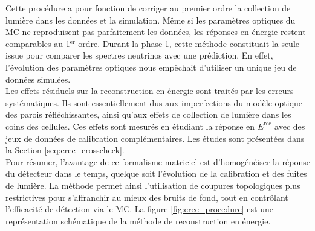 Cette procédure a pour fonction de corriger au premier ordre la collection de lumière dans les données et la simulation. Même si les paramètres optiques du MC ne reproduisent pas parfaitement les données, les réponses en énergie restent comparables au 1$^\textrm{er}$ ordre. Durant la phase 1, cette méthode constituait la seule issue pour comparer les spectres neutrinos avec une prédiction. En effet, l'évolution des paramètres optiques nous empêchait d'utiliser un unique jeu de données simulées.\\

Les effets résiduels sur la reconstruction en énergie sont traités par les erreurs systématiques. Ils sont essentiellement dus aux imperfections du modèle optique des parois réfléchissantes, ainsi qu'aux effets de collection de lumière dans les coins des cellules. Ces effets sont mesurés en étudiant la réponse en $E^{\textrm{rec}}$ avec des jeux de données de calibration complémentaires. Les études sont présentées dans la Section \ref{seq:erec_crosscheck}.\\


Pour résumer, l'avantage de ce formalisme matriciel est d'homogénéiser la réponse du détecteur dans le temps, quelque soit l'évolution de la calibration et des fuites de lumière. La méthode permet ainsi l'utilisation de coupures topologiques plus restrictives pour s'affranchir au mieux des bruits de fond, tout en contrôlant l'efficacité de détection via le MC. La figure \ref{fig:erec_procedure} est une représentation schématique de la méthode de reconstruction en énergie.


